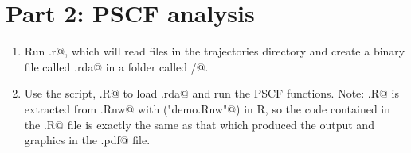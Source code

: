 \documentclass{article}
\begin{document}
\section{Part 2: PSCF analysis}
\begin{enumerate}
\item
  Run \verb@makecoords.r@, which will read files in the trajectories
  directory and create a binary file called \verb@coords.rda@ in a
  folder called \verb@outputs/@.
\item Use the script, \verb@PSCFdemo.R@ to load \verb@coords.rda@ and
  run the PSCF functions. Note: \verb@PSCFdemo.R@ is extracted from
  \verb@PSCFdemo.Rnw@ with
  {\color{midnightblue}\verb@Stangle("demo.Rnw"@)} in R, so the code
  contained in the \verb@PSCFdemo.R@ file is exactly the same as that
  which produced the output and graphics in the \verb@PSCFdemo.pdf@
  file.
\end{enumerate}
\end{document}
